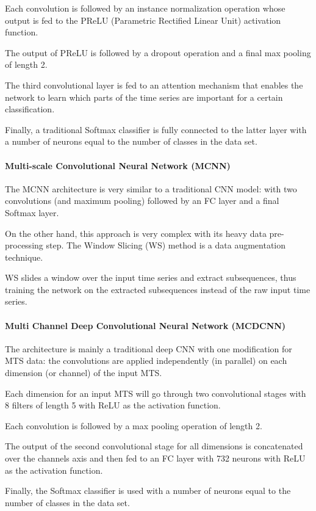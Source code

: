 \documentclass[conference]{IEEEtran}
\begin{document}
Each convolution is followed by an instance normalization operation whose output is fed to the PReLU (Parametric Rectified Linear Unit) activation function. 

The output of PReLU is followed by a dropout operation and a final max pooling of length 2. 

The third convolutional layer is fed to an attention mechanism that enables the network to learn which parts of the time series are important for a certain classification. 

Finally, a traditional Softmax classifier is fully connected to the latter layer with a number of neurons equal to the number of classes in the data set.

\paragraph{Multi-scale Convolutional Neural Network (MCNN)}
The MCNN architecture \cite{cui2016multiscale} is very similar to a traditional CNN model: with two convolutions (and maximum pooling) followed by an FC layer and a final Softmax layer. 

On the other hand, this approach is very complex with its heavy data pre-processing step. The Window Slicing (WS) method is a data augmentation technique. 

WS slides a window over the input time series and extract subsequences, thus training the network on the extracted subsequences instead of the raw input time series.

\paragraph{Multi Channel Deep Convolutional Neural Network (MCDCNN)}
The architecture \cite{Zheng2014TimeSC} is mainly a traditional deep CNN with one modification for MTS data: the convolutions are applied independently (in parallel) on each dimension (or channel) of the input MTS. 

Each dimension for an input MTS will go through two convolutional stages with 8 filters of length 5 with ReLU as the activation function. 

Each convolution is followed by a max pooling operation of length 2. 

The output of the second convolutional stage for all dimensions is concatenated over the channels axis and then fed to an FC layer with 732 neurons with ReLU as the activation function. 

Finally, the Softmax classifier is used with a number of neurons equal to the number of classes in the data set.
\end{document}

